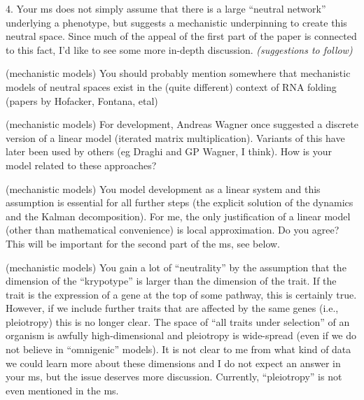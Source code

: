 \begin{point}{4.}
    Your ms does not simply assume that there is a large ``neutral network''
underlying a phenotype, but suggests a mechanistic underpinning to create this
neutral space. Since much of the appeal of the first part of the paper is
connected to this fact, I'd like to see some more in-depth discussion.
\textit{(suggestions to follow)}
\end{point}


\begin{point}{(mechanistic models)}
    You should probably mention somewhere that mechanistic models of neutral
  spaces exist in the (quite different) context of RNA folding (papers by Hofacker, Fontana, etal)
\end{point}


\begin{point}{(mechanistic models)}
    For development, Andreas Wagner once suggested a discrete version of a linear
  model (iterated matrix multiplication). Variants of this have later been used
by others (eg Draghi and GP Wagner, I think). How is your model related to these approaches?
\end{point}


\begin{point}{(mechanistic models)}
    You model development as a linear system and this assumption is essential
   for all further steps (the explicit solution of the dynamics and the Kalman
decomposition). For me, the only justification of a linear model (other than
mathematical convenience) is local approximation. Do you agree? This will be
important for the second part of the ms, see below.
\end{point}


\begin{point}{(mechanistic models)}
    You gain a lot of ``neutrality'' by the assumption that the dimension of the
  ``krypotype'' is larger than the dimension of the trait. If the trait is the
expression of a gene at the top of some pathway, this is certainly true.
However, if we include further traits that are affected by the same genes
(i.e., pleiotropy) this is no longer clear. The space of ``all traits under
selection'' of an organism is awfully high-dimensional and pleiotropy is
wide-spread (even if we do not believe in ``omnigenic'' models). It is not clear
to me from what kind of data we could learn more about these dimensions and I
do not expect an answer in your ms, but the issue deserves more discussion.
Currently, ``pleiotropy'' is not even mentioned in the ms.   
\end{point}

